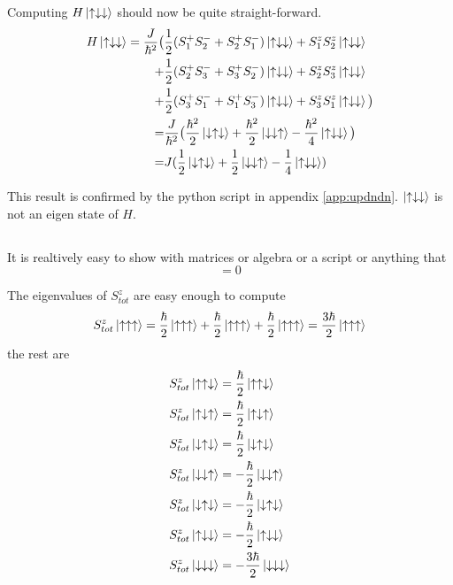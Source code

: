 \documentclass{article}
\begin{document}
Computing $H\ket{\uparrow\downarrow\downarrow}$ should now be quite straight-forward.
\begin{align*}
H\ket{\uparrow\downarrow\downarrow} = 
\frac{J}{\hbar^2} \big(&\frac{1}{2} (S_1^+S_2^- + S_2^+S_1^-)\ket{\uparrow\downarrow\downarrow} + S_1^zS_2^z\ket{\uparrow\downarrow\downarrow} \\
+&\frac{1}{2}(S_2^+S_3^- + S_3^+S_2^-)\ket{\uparrow\downarrow\downarrow} + S_2^zS_3^z\ket{\uparrow\downarrow\downarrow} \\
+&\frac{1}{2}(S_3^+S_1^- + S_1^+S_3^-)\ket{\uparrow\downarrow\downarrow} + S_3^zS_1^z\ket{\uparrow\downarrow\downarrow} \big)\\
=&\frac{J}{\hbar^2}\big(
\frac{\hbar^2}{2}\ket{\downarrow\uparrow\downarrow} + 
\frac{\hbar^2}{2}\ket{\downarrow\downarrow\uparrow} -
\frac{\hbar^2}{4}\ket{\uparrow\downarrow\downarrow} 
\big) \\
=&J(
\frac{1}{2}\ket{\downarrow\uparrow\downarrow} +
\frac{1}{2}\ket{\downarrow\downarrow\uparrow} -
\frac{1}{4}\ket{\uparrow\downarrow\downarrow})
\end{align*}

This result is confirmed by the python script in appendix \ref{app:updndn}. $\ket{\uparrow\downarrow\downarrow}$ is not an eigen state of $H$.

\subsection{}
It is realtively easy to show with matrices or algebra or a script or anything that
\begin{equation}
[H,S^z_{tot}]=0
\end{equation}

The eigenvalues of $S^z_{tot}$ are easy enough to compute
\begin{equation*}
S^z_{tot}\ket{\uparrow\uparrow\uparrow}=\frac{\hbar}{2}\ket{\uparrow\uparrow\uparrow}+\frac{\hbar}{2}\ket{\uparrow\uparrow\uparrow} + \frac{\hbar}{2}\ket{\uparrow\uparrow\uparrow} = \frac{3\hbar}{2}\ket{\uparrow\uparrow\uparrow}
\end{equation*}
the rest are
\begin{align*}
S^z_{tot}\ket{\uparrow\uparrow\downarrow}&=\frac{\hbar}{2}\ket{\uparrow\uparrow\downarrow} \\
S^z_{tot}\ket{\uparrow\downarrow\uparrow}&=\frac{\hbar}{2}\ket{\uparrow\downarrow\uparrow} \\
S^z_{tot}\ket{\downarrow\uparrow\downarrow}&=\frac{\hbar}{2}\ket{\downarrow\uparrow\downarrow} \\
S^z_{tot}\ket{\downarrow\downarrow\uparrow}&=-\frac{\hbar}{2}\ket{\downarrow\downarrow\uparrow} \\
S^z_{tot}\ket{\downarrow\uparrow\downarrow}&=-\frac{\hbar}{2}\ket{\downarrow\uparrow\downarrow} \\
S^z_{tot}\ket{\uparrow\downarrow\downarrow}&=-\frac{\hbar}{2}\ket{\uparrow\downarrow\downarrow} \\
S^z_{tot}\ket{\downarrow\downarrow\downarrow}&=-\frac{3\hbar}{2}\ket{\downarrow\downarrow\downarrow} 
\end{align*}
\end{document}
